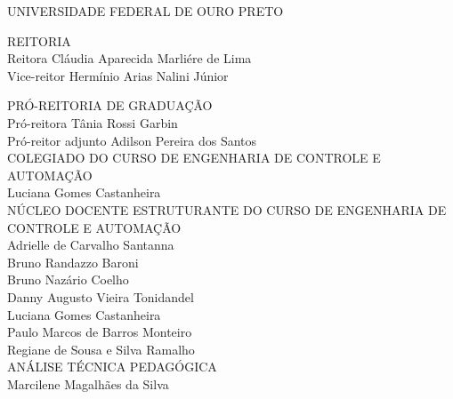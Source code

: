 \documentclass[
	12pt,				%
	openright,			%
	oneside,			%
	a4paper,			%
	english,			%
	brazil				%
	]{abntex2}
\begin{document}
 \begin{folhaderosto}
\thispagestyle{empty}
\begin{center}
    UNIVERSIDADE FEDERAL DE OURO PRETO
    \vspace*{1cm}

REITORIA\\
Reitora Cláudia Aparecida Marliére de Lima \\
Vice-reitor Hermínio Arias Nalini Júnior \\
\vspace*{1cm}

PRÓ-REITORIA DE GRADUAÇÃO\\
Pró-reitora Tânia Rossi Garbin \\
Pró-reitor adjunto Adilson Pereira dos Santos \\
\vspace*{1cm}
COLEGIADO DO CURSO DE ENGENHARIA DE CONTROLE E AUTOMAÇÃO \\
Luciana Gomes Castanheira \\
\vspace*{1cm}
NÚCLEO DOCENTE ESTRUTURANTE DO CURSO DE ENGENHARIA DE CONTROLE E AUTOMAÇÃO \\
Adrielle de Carvalho Santanna \\
Bruno Randazzo Baroni \\
Bruno Nazário Coelho \\
Danny Augusto Vieira Tonidandel \\
Luciana Gomes Castanheira \\
Paulo Marcos de Barros Monteiro \\
Regiane de Sousa e Silva Ramalho \\
\vspace*{1cm}
ANÁLISE TÉCNICA PEDAGÓGICA \\
Marcilene Magalhães da Silva \\

\vspace*{\fill}

\large\imprimirdata
\end{center}
 \end{folhaderosto}
\tableofcontents*
\cleardoublepage
%     
\end{document}
